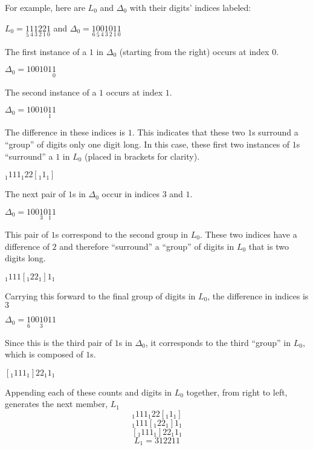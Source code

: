 \documentclass{article}
\begin{document}
		\noindent For example, here are $L_0$ and $\Delta_0$ with their digits' indices labeled:
		\begin{center}
		$L_0 = 
		\underset{5}{1}\underset{4}{1}\underset{3}{1}\underset{2}{2}\underset{1}{2}\underset{0}{1}
		$
		and
		$\Delta_0 = 
		\underset{6}{1}\underset{5}{0}\underset{4}{0}\underset{3}{1}\underset{2}{0}\underset{1}{1}
		\underset{0}{1}
		$
		\end{center}
		The first instance of a $1$ in $\Delta_0$ (starting from the right) occurs at index $0$.
		\begin{center}
		$\Delta_0 = 100101\underset{0}{1}$
		\end{center}
		The second instance of a $1$ occurs at index $1$.
		\begin{center}
		$\Delta_0 = 10010\underset{1}{1}1$
		\end{center}
		The difference in these indices is $1$. This indicates that these two $1$s surround a 
		``group'' of digits only one digit long. In this case, these first two instances of $1$s 
		``surround'' a $1$ in $L_0$ (placed in brackets for clarity).
		\begin{center}
		$_1{1}{1}{1}_1{2}{2}[_1{1}_1]$
		\end{center}
		The next pair of $1$s in $\Delta_0$ occur in indices $3$ and $1$.
		\begin{center}
		$\Delta_0 = 100\underset{3}{1}0\underset{1}{1}1$
		\end{center}
		This pair of $1$s correspond to the second group in $L_0$. These two indices have a 
		difference of $2$ and therefore ``surround'' a ``group'' of digits in $L_0$ that is two 
		digits long.
		\begin{center}
		$_1{1}{1}{1}[_1{2}{2}_1]{1}_1$
		\end{center}
		Carrying this forward to the final group of digits in $L_0$, the difference in indices is
		$3$
		\begin{center}
		$\Delta_0 = \underset{6}{1}00\underset{3}{1}011$ 
		\end{center}
		Since this is the third pair of $1$s in $\Delta_0$, it corresponds to the third 
		``group'' in $L_0$, which is composed of $1$s.
		\begin{center}
		$[_1{1}{1}{1}_1]{2}{2}_1{1}_1$
		\end{center}
		Appending each of these counts and digits in $L_0$ together, from right to left, generates 
		the next member, $L_1$
		\[
			_1{1}{1}{1}_1{2}{2}[_1{1}_1] \tag*{one one}
		\]
		\[
			_1{1}{1}{1}[_1{2}{2}_1]{1}_1 \tag*{two two}
		\]
		\[
			[_1{1}{1}{1}_1]{2}{2}_1{1}_1 \tag*{three one}
		\]
		\[
			L_1 = 312211
		\]
		\clearpage
\end{document}
